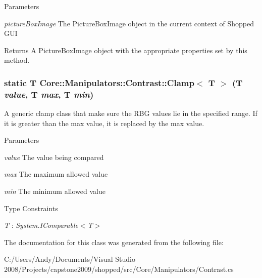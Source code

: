 \begin{DoxyParams}{Parameters}
\item[{\em pictureBoxImage}]The PictureBoxImage object in the current context of Shopped GUI \end{DoxyParams}
\begin{DoxyReturn}{Returns}
A PictureBoxImage object with the appropriate properties set by this method. 
\end{DoxyReturn}
\hypertarget{class_core_1_1_manipulators_1_1_contrast_a4898ce913d2031a4c9fa6fe73eba5c0e}{
\subsubsection[{Clamp$<$ T $>$}]{\setlength{\rightskip}{0pt plus 5cm}static T Core::Manipulators::Contrast::Clamp$<$ T $>$ (T {\em value}, \/  T {\em max}, \/  T {\em min})}}
\label{class_core_1_1_manipulators_1_1_contrast_a4898ce913d2031a4c9fa6fe73eba5c0e}
A generic clamp class that make sure the RBG values lie in the specified range. If it is greater than the max value, it is replaced by the max value.


\begin{DoxyParams}{Parameters}
\item[{\em value}]The value being compared \item[{\em max}]The maximum allowed value \item[{\em min}]The minimum allowed value \end{DoxyParams}
\begin{Desc}
\item[Type Constraints]\begin{description}
\item[{\em T} : {\em System.IComparable$<$T$>$}]\end{description}
\end{Desc}


The documentation for this class was generated from the following file:\begin{DoxyCompactItemize}
\item 
C:/Users/Andy/Documents/Visual Studio 2008/Projects/capstone2009/shopped/src/Core/Manipulators/Contrast.cs\end{DoxyCompactItemize}
